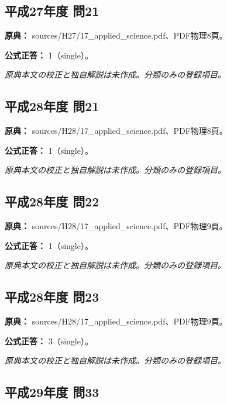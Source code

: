 \subsection{平成27年度 問21}
\label{q:h27-reg-applied-21}

\noindent\textbf{原典：} sources/H27/17\_applied\_science.pdf、PDF物理8頁。

\textbf{公式正答：} 1（single）。

\par\textit{原典本文の校正と独自解説は未作成。分類のみの登録項目。}

\subsection{平成28年度 問21}
\label{q:h28-reg-applied-21}

\noindent\textbf{原典：} sources/H28/17\_applied\_science.pdf、PDF物理8頁。

\textbf{公式正答：} 1（single）。

\par\textit{原典本文の校正と独自解説は未作成。分類のみの登録項目。}

\subsection{平成28年度 問22}
\label{q:h28-reg-applied-22}

\noindent\textbf{原典：} sources/H28/17\_applied\_science.pdf、PDF物理9頁。

\textbf{公式正答：} 1（single）。

\par\textit{原典本文の校正と独自解説は未作成。分類のみの登録項目。}

\subsection{平成28年度 問23}
\label{q:h28-reg-applied-23}

\noindent\textbf{原典：} sources/H28/17\_applied\_science.pdf、PDF物理9頁。

\textbf{公式正答：} 3（single）。

\par\textit{原典本文の校正と独自解説は未作成。分類のみの登録項目。}

\subsection{平成29年度 問33}
\label{q:h29-reg-applied-33}

